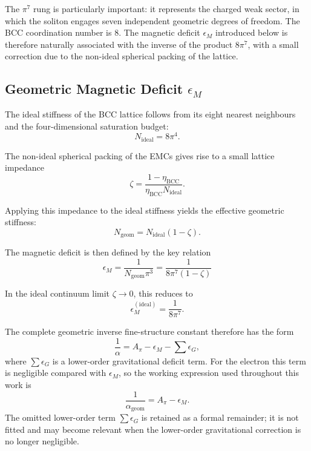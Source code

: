 \documentclass[10pt,a4paper]{article}
\begin{document}
The \(\pi^7\) rung is particularly important: it represents the charged weak sector, in which the soliton engages seven independent geometric degrees of freedom. The BCC coordination number is \(8\). The magnetic deficit \(\epsilon_M\) introduced below is therefore naturally associated with the inverse of the product \(8\pi^7\), with a small correction due to the non-ideal spherical packing of the lattice. 

\subsection{Geometric Magnetic Deficit \(\epsilon_M\)}
\label{sec:magnetic_deficit}

The ideal stiffness of the BCC lattice follows from its eight nearest neighbours and the four-dimensional saturation budget:
\begin{equation}
	N_{\text{ideal}} = 8\pi^4 .
	\label{eq:N_ideal}
\end{equation}

The non-ideal spherical packing of the EMCs gives rise to a small lattice impedance
\begin{equation}
	\zeta = \frac{1-\eta_{\text{BCC}}}{\eta_{\text{BCC}} N_{\text{ideal}}} .
	\label{eq:zeta}
\end{equation}

Applying this impedance to the ideal stiffness yields the effective geometric stiffness:
\begin{equation}
	N_{\text{geom}} = N_{\text{ideal}} (1-\zeta) .
	\label{eq:N_geom}
\end{equation}

The magnetic deficit is then defined by the key relation
\begin{equation}
	\boxed{
		\epsilon_M = \frac{1}{N_{\text{geom}} \pi^3}
		= \frac{1}{8\pi^7 (1-\zeta)}
	}
	\label{eq:epsilon_M_definition}
\end{equation}

In the ideal continuum limit \(\zeta \to 0\), this reduces to
\begin{equation}
	\epsilon_M^{(\text{ideal})} = \frac{1}{8\pi^7} .
	\label{eq:epsilon_M_final_geo}
\end{equation}

The complete geometric inverse fine-structure constant therefore has the form
\begin{equation}
	\frac{1}{\alpha} = A_\pi - \epsilon_M - \sum \epsilon_G,
\end{equation}
where \(\sum \epsilon_G\) is a lower-order gravitational deficit term.
For the electron this term is negligible compared with \(\epsilon_M\), so the working expression used throughout this work is
\begin{equation}
	\frac{1}{\alpha_{\text{geom}}} = A_\pi - \epsilon_M .
	\label{eq:alpha_normalized_final}
\end{equation}
The omitted lower-order term \(\sum \epsilon_G\) is retained as a formal remainder; it is not fitted and may become relevant when the lower-order gravitational correction is no longer negligible.
\end{document}
